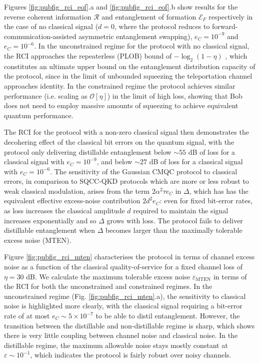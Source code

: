 \documentclass[%
 reprint,
 superscriptaddress,
 amsmath,
 amssymb,
 aps,
 pra,
]{revtex4-2}
\newcommand{\e}{\varepsilon}
\begin{document}
Figures \ref{fig:pubfig_rci_eof}.a and \ref{fig:pubfig_rci_eof}.b show results for the reverse coherent information $\mathcal{R}$ and entanglement of formation $\mathcal{E}_F$ respectively in the case of no classical signal ($d = 0$, where the protocol reduces to forward-communication-assisted asymmetric entanglement swapping), $e_C = 10^{-9}$ and $e_C = 10^{-6}$. In the unconstrained regime for the protocol with no classical signal, the RCI approaches the repeaterless (PLOB) bound of $-\log_2(1 - \eta)$ \cite{pirandola_fundamental_2017}, which constitutes an ultimate upper bound on the entanglement distribution capacity of the protocol, since in the limit of unbounded squeezing the teleportation channel approaches identity. In the constrained regime the protocol achieves similar performance (i.e. scaling as $\mathcal{O}[\eta]$) in the limit of high loss, showing that Bob does not need to employ massive amounts of squeezing to achieve equivalent quantum performance.

The RCI for the protocol with a non-zero classical signal then demonstrates the decohering effect of the classical bit errors on the quantum signal, with the protocol only delivering distillable entanglement below $\sim 55$ dB of loss for a classical signal with $e_C = 10^{-9}$, and below $\sim 27$ dB of loss for a classical signal with $e_C = 10^{-6}$. The sensitivity of the Gaussian CMQC protocol to classical errors, in comparison to SQCC-QKD protocols \cite{zaunders_enhanced_2025} which are more or less robust to weak classical modulation, arises from the term $2 \alpha^2 \tau e_C$ in $\Delta$, which has has the equivalent effective excess-noise contribution $2d^2e_C$: even for fixed bit-error rates, as loss increases the classical amplitude $d$ required to maintain the signal increases exponentially and so $\Delta$ grows with loss. The protocol fails to deliver distillable entanglement when $\Delta$ becomes larger than the maximally tolerable excess noise (MTEN).

Figure \ref{fig:pubfig_rci_mten} characterises the protocol in terms of channel excess noise as a function of the classical quality-of-service for a fixed channel loss of $\eta = 30$ dB. We calculate the maximum tolerable excess noise $\e_\mathrm{MTEN}$ in terms of the RCI for both the unconstrained and constrained regimes. In the unconstrained regime (Fig. \ref{fig:pubfig_rci_mten}.a), the sensitivity to classical noise is highlighted more clearly, with the classical signal requiring a bit-error rate of at most $e_C \sim 5\times10^{-7}$ to be able to distil entanglement. However, the transition between the distillable and non-distillable regime is sharp, which shows there is very little coupling between channel noise and classical noise. In the distillable regime, the maximum allowable noise stays mostly constant at $\e \sim 10^{-1}$, which indicates the protocol is fairly robust over noisy channels.
\end{document}
